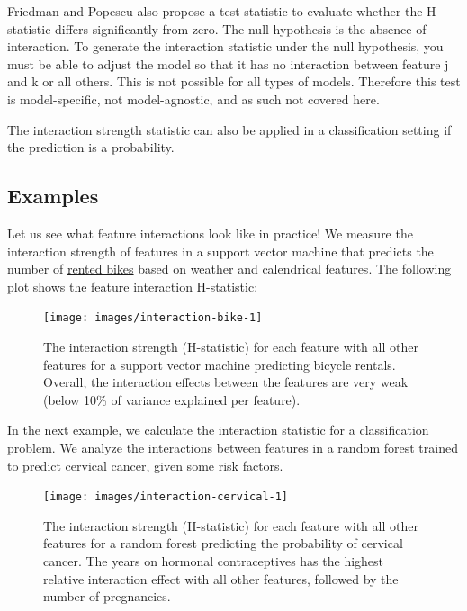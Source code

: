 \documentclass[
  12pt,
]{krantz}
\begin{document}
Friedman and Popescu also propose a test statistic to evaluate whether the H-statistic differs significantly from zero.
The null hypothesis is the absence of interaction.
To generate the interaction statistic under the null hypothesis, you must be able to adjust the model so that it has no interaction between feature j and k or all others.
This is not possible for all types of models.
Therefore this test is model-specific, not model-agnostic, and as such not covered here.

The interaction strength statistic can also be applied in a classification setting if the prediction is a probability.

\hypertarget{examples-2}{%
\subsection{Examples}\label{examples-2}}

Let us see what feature interactions look like in practice!
We measure the interaction strength of features in a support vector machine that predicts the number of \protect\hyperlink{bike-data}{rented bikes} based on weather and calendrical features.
The following plot shows the feature interaction H-statistic:

\begin{figure}

{\centering \texttt{[image: images/interaction-bike-1]} 

}

\caption{The interaction strength (H-statistic) for each feature with all other features for a support vector machine predicting bicycle rentals. Overall, the interaction effects between the features are very weak (below 10\% of variance explained per feature).}\label{fig:interaction-bike}
\end{figure}

In the next example, we calculate the interaction statistic for a classification problem.
We analyze the interactions between features in a random forest trained to predict \protect\hyperlink{cervical}{cervical cancer}, given some risk factors.

\begin{figure}

{\centering \texttt{[image: images/interaction-cervical-1]} 

}

\caption{The interaction strength (H-statistic) for each feature with all other features for a random forest predicting the probability of cervical cancer. The years on hormonal contraceptives has the highest relative interaction effect with all other features, followed by the number of pregnancies.}\label{fig:interaction-cervical-include}
\end{figure}
\end{document}
